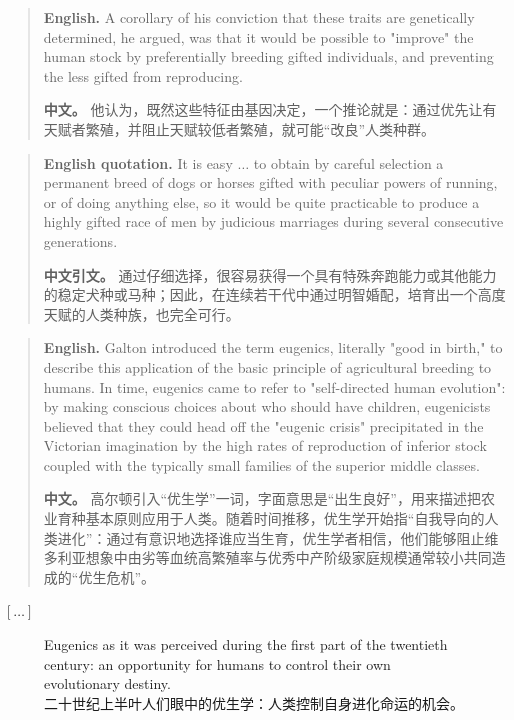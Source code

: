 \begin{quote}
\noindent\textbf{English.} A corollary of his conviction that these traits are genetically determined, he argued, was that it would be possible to "improve" the human stock by preferentially breeding gifted individuals, and preventing the less gifted from reproducing.

\smallskip
\noindent\textbf{中文。} 他认为，既然这些特征由基因决定，一个推论就是：通过优先让有天赋者繁殖，并阻止天赋较低者繁殖，就可能“改良”人类种群。
\end{quote}

\begin{quote}
\noindent\textbf{English quotation.} It is easy \(\ldots\) to obtain by careful selection a permanent breed of dogs or horses gifted with peculiar powers of running, or of doing anything else, so it would be quite practicable to produce a highly gifted race of men by judicious marriages during several consecutive generations.

\smallskip
\noindent\textbf{中文引文。} 通过仔细选择，很容易获得一个具有特殊奔跑能力或其他能力的稳定犬种或马种；因此，在连续若干代中通过明智婚配，培育出一个高度天赋的人类种族，也完全可行。
\end{quote}

\begin{quote}
\noindent\textbf{English.} Galton introduced the term eugenics, literally "good in birth," to describe this application of the basic principle of agricultural breeding to humans. In time, eugenics came to refer to "self-directed human evolution": by making conscious choices about who should have children, eugenicists believed that they could head off the "eugenic crisis" precipitated in the Victorian imagination by the high rates of reproduction of inferior stock coupled with the typically small families of the superior middle classes.

\smallskip
\noindent\textbf{中文。} 高尔顿引入“优生学”一词，字面意思是“出生良好”，用来描述把农业育种基本原则应用于人类。随着时间推移，优生学开始指“自我导向的人类进化”：通过有意识地选择谁应当生育，优生学者相信，他们能够阻止维多利亚想象中由劣等血统高繁殖率与优秀中产阶级家庭规模通常较小共同造成的“优生危机”。
\end{quote}

\begin{center}
\([\ldots]\)
\end{center}

\begin{figure}[htbp]
\centering
{}
\caption{Eugenics as it was perceived during the first part of the twentieth century: an opportunity for humans to control their own evolutionary destiny.\\二十世纪上半叶人们眼中的优生学：人类控制自身进化命运的机会。}
\end{figure}


